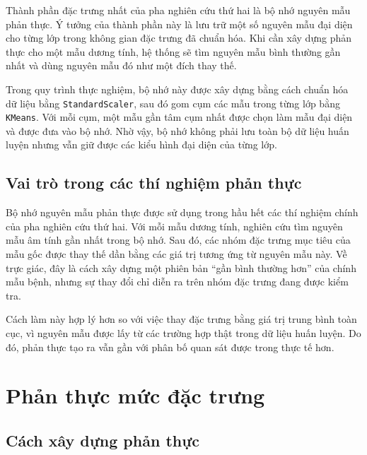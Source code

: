 \blocksep

Thành phần đặc trưng nhất của pha nghiên cứu thứ hai là bộ nhớ nguyên mẫu phản thực. Ý tưởng của thành phần này là lưu trữ một số nguyên mẫu đại diện cho từng lớp trong không gian đặc trưng đã chuẩn hóa. Khi cần xây dựng phản thực cho một mẫu dương tính, hệ thống sẽ tìm nguyên mẫu bình thường gần nhất và dùng nguyên mẫu đó như một đích thay thế.

\blocksep

Trong quy trình thực nghiệm, bộ nhớ này được xây dựng bằng cách chuẩn hóa dữ liệu bằng \texttt{StandardScaler}, sau đó gom cụm các mẫu trong từng lớp bằng \texttt{KMeans}. Với mỗi cụm, một mẫu gần tâm cụm nhất được chọn làm mẫu đại diện và được đưa vào bộ nhớ. Nhờ vậy, bộ nhớ không phải lưu toàn bộ dữ liệu huấn luyện nhưng vẫn giữ được các kiểu hình đại diện của từng lớp.

\blocksep

\subsection{Vai trò trong các thí nghiệm phản thực}

\blocksep

Bộ nhớ nguyên mẫu phản thực được sử dụng trong hầu hết các thí nghiệm chính của pha nghiên cứu thứ hai. Với mỗi mẫu dương tính, nghiên cứu tìm nguyên mẫu âm tính gần nhất trong bộ nhớ. Sau đó, các nhóm đặc trưng mục tiêu của mẫu gốc được thay thế dần bằng các giá trị tương ứng từ nguyên mẫu này. Về trực giác, đây là cách xây dựng một phiên bản “gần bình thường hơn” của chính mẫu bệnh, nhưng sự thay đổi chỉ diễn ra trên nhóm đặc trưng đang được kiểm tra.

\blocksep

Cách làm này hợp lý hơn so với việc thay đặc trưng bằng giá trị trung bình toàn cục, vì nguyên mẫu được lấy từ các trường hợp thật trong dữ liệu huấn luyện. Do đó, phản thực tạo ra vẫn gần với phân bố quan sát được trong thực tế hơn.

\section{Phản thực mức đặc trưng}

\blocksep

\subsection{Cách xây dựng phản thực}

